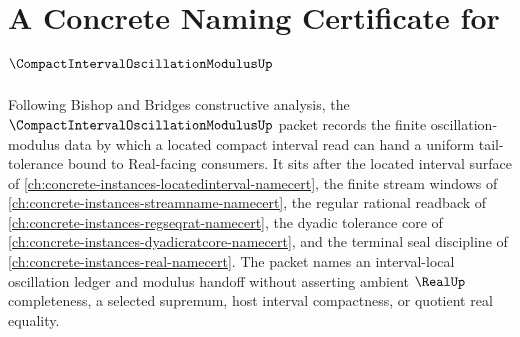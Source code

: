 \chapter{A Concrete Naming Certificate for $\CompactIntervalOscillationModulusUp$}
\label{ch:concrete-instances-compact-interval-oscillation-modulus-namecert}

Following Bishop and Bridges constructive analysis, the $\CompactIntervalOscillationModulusUp$ packet records the finite oscillation-modulus data by which a located compact interval read can hand a uniform tail-tolerance bound to Real-facing consumers. It sits after the located interval surface of \autoref{ch:concrete-instances-locatedinterval-namecert}, the finite stream windows of \autoref{ch:concrete-instances-streamname-namecert}, the regular rational readback of \autoref{ch:concrete-instances-regseqrat-namecert}, the dyadic tolerance core of \autoref{ch:concrete-instances-dyadicratcore-namecert}, and the terminal seal discipline of \autoref{ch:concrete-instances-real-namecert}. The packet names an interval-local oscillation ledger and modulus handoff without asserting ambient $\RealUp$ completeness, a selected supremum, host interval compactness, or quotient real equality.

